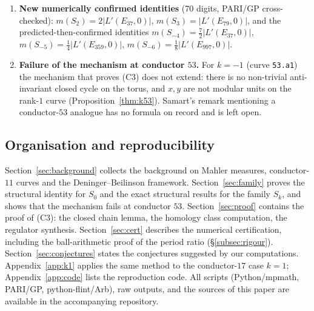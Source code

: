 \documentclass[11pt]{amsart}
\theoremstyle{definition}
\theoremstyle{remark}
\begin{document}
\begin{enumerate}
  which suffices for the conductor-$17$ argument; at $k=-3,-2,-1,2,3$ the
  symbol is not cuspidal). The resulting dichotomy matches all numerical
  evidence:
  Boyd-type identities are proved for $k=0$ and (conditionally on the
  normalization lemma) $k=1$; observed
  numerically for $k\notin[-4,2]$ in all computed cases
  (Conjecture~\ref{conj:family}); and no rational relation is found within
  the PSLQ bound $10^8$ for $k=-1,-2,-3$.
  \item \textbf{New numerically confirmed identities} (70 digits, PARI/GP
  cross-checked): $m(S_2)=2|L'(E_{37},0)|$, $m(S_3)=|L'(E_{79},0)|$, and the
  predicted-then-confirmed identities
  $m(S_{-4})=\tfrac72|L'(E_{37},0)|$,
  $m(S_{-5})=\tfrac14|L'(E_{359},0)|$,
  $m(S_{-6})=\tfrac18|L'(E_{997},0)|$.
  \item \textbf{Failure of the mechanism at conductor $53$.} For $k=-1$
  (curve \texttt{53.a1}) the mechanism that proves (C3) does not extend:
  there is no non-trivial anti-invariant closed cycle on the torus, and
  $x,y$ are not modular units on the rank-$1$ curve
  (Proposition~\ref{thm:k53}). Samart's remark mentioning a conductor-$53$
  analogue has no formula on record and is left open.
\end{enumerate}

\subsection{Organisation and reproducibility}

Section~\ref{sec:background} collects the background on Mahler measures,
conductor-$11$ curves and the Deninger--Beilinson framework.
Section~\ref{sec:family} proves the structural identity for $S_0$ and the
exact structural results for the family $S_k$, and shows that the mechanism
fails at conductor $53$. Section~\ref{sec:proof} contains the proof of
(C3): the closed chain
lemma, the homology class computation, the regulator synthesis.
Section~\ref{sec:cert} describes the numerical certification, including the
ball-arithmetic proof of the period ratio (\S\ref{subsec:rigour}).
Section~\ref{sec:conjectures} states the conjectures suggested by our
computations. Appendix~\ref{app:k1} applies the same method to the
conductor-$17$ case $k=1$; Appendix~\ref{app:code} lists the reproduction
code. All
scripts (Python/mpmath, PARI/GP, python-flint/Arb), raw outputs, and the
sources of this paper are available in the accompanying repository.

\end{document}
